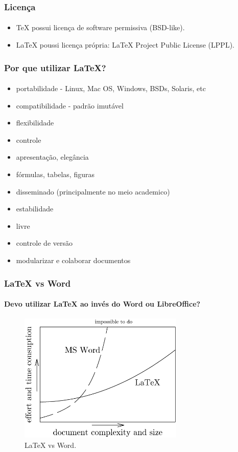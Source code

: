 \begin{frame}
\frametitle{Licença}
\framesubtitle{}
\begin{itemize}
  \item \TeX{} possui licença de software permissiva (BSD-like).
  \item \LaTeX{} poussi licença própria: \LaTeX{} Project Public License (LPPL).
\end{itemize}
\end{frame}


\begin{frame}
\frametitle{Por que utilizar \LaTeX{}?}
\framesubtitle{}
\begin{itemize}
  \item portabilidade - Linux, Mac OS, Windows, BSDs, Solaris, etc
  \item compatibilidade - padrão imutável
  \item flexibilidade
  \item controle
  \item apresentação, elegância
  \item fórmulas, tabelas, figuras
  \item disseminado (principalmente no meio academico)
  \item estabilidade
  \item livre
  \item controle de versão
  \item modularizar e colaborar documentos
\end{itemize}
\end{frame}

\begin{frame}
\frametitle{\LaTeX{} vs Word}
\framesubtitle{Devo utilizar \LaTeX{} ao invés do Word ou LibreOffice?}
  \begin{figure}[h!]
  \centering
  \includegraphics[width=0.7\textwidth]{figures/word_vs_latex.png}
  \caption{\LaTeX{} vs Word.}
  \label{fig:word_vs_latex}
  \end{figure}
\end{frame}

